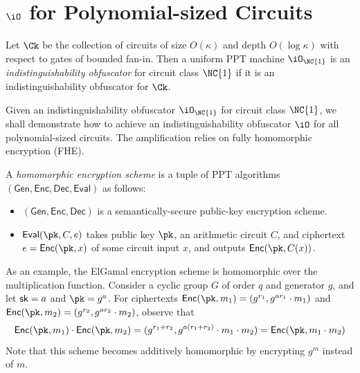 \documentclass[12pt]{tufte-book}
\newcommand{\Enc}{\mathsf{Enc}}
\newcommand{\Dec}{\mathsf{Dec}}
\newcommand{\Eval}{\mathsf{Eval}}
\begin{document}
 \newcommand{\cO}{\ensuremath{\mathcal{O}}}


\section{$\iO$ for Polynomial-sized Circuits}


\begin{definition}
Let $\Ck$ be the collection of circuits of size $O(\kappa)$ and depth
$O(\log{\kappa})$ with respect to gates of bounded fan-in.
Then a uniform PPT machine $\iO_{\NC{1}}$ is an
\emph{indistinguishability obfuscator} for circuit class $\NC{1}$ if it
is an indistinguishability obfuscator for $\Ck$.
\end{definition}

Given an indistinguishability obfuscator $\iO_{\NC{1}}$ for circuit
class $\NC{1}$, we shall demonstrate how to achieve an
indistinguishability obfuscator $\iO$ for all polynomial-sized circuits.
The amplification relies on fully homomorphic encryption (FHE).

\newcommand{\GEN}{\ensuremath{\mathsf{Gen}}}


\begin{definition}
A \emph{homomorphic encryption scheme} is a tuple of PPT algorithms
$(\GEN, \Enc, \Dec, \Eval)$ as follows:
\begin{itemize}
\item
	$(\GEN, \Enc, \Dec)$ is a semantically-secure public-key
	encryption scheme.
\item
	$\Eval(\pk, C, e)$ takes public key $\pk$, an arithmetic circuit
	$C$, and ciphertext $e = \Enc(\pk, x)$ of some circuit input
	$x$, and outputs $\Enc(\pk, C(x))$.
\end{itemize}
\end{definition}

As an example, the ElGamal encryption scheme is homomorphic over the multiplication function.
Consider a cyclic group $G$ of order $q$ and generator $g$, and let
$\mathsf{sk} = a$ and $\pk = g^a$.
For ciphertexts $\Enc(\pk, m_1) = (g^{r_1}, g^{a r_1} \cdot m_1)$
and $\Enc(\pk, m_2) = (g^{r_2}, g^{a r_2} \cdot m_2)$, observe that
\begin{equation*}
\Enc(\pk, m_1) \cdot \Enc(\pk, m_2) = (g^{r_1 + r_2}, g^{a (r_1 + r_2)}
\cdot m_1 \cdot m_2) = \Enc(\pk, m_1 \cdot m_2)
\end{equation*}
Note that this scheme becomes additively homomorphic by encrypting $g^m$
instead of $m$.
\end{document}
